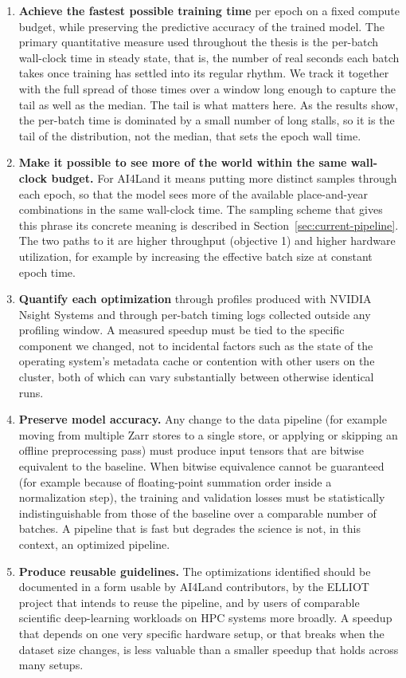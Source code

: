 \documentclass[12pt,a4paper]{article}
\begin{document}
\begin{enumerate}
  \item \textbf{Achieve the fastest possible training time} per epoch on a fixed compute
    budget, while preserving the predictive accuracy of the trained model. The primary
    quantitative measure used throughout the thesis is the per-batch wall-clock time in
    steady state, that is, the number of real seconds each batch takes once training has
    settled into its regular rhythm. We track it together with the full spread of those
    times over a window long enough to capture the tail as well as the median. The tail is what matters here. As the results
    show, the per-batch time is dominated by a small number of long stalls, so it is the tail
    of the distribution, not the median, that sets the epoch wall time.
  \item \textbf{Make it possible to see more of the world within the same wall-clock budget.}
    For AI4Land it means putting more distinct samples through each epoch, so that the model sees
    more of the available place-and-year combinations in the same wall-clock time. The sampling
    scheme that gives this phrase its concrete meaning is described in
    Section~\ref{sec:current-pipeline}. The two paths to it are higher throughput (objective 1) and
    higher hardware utilization, for example by increasing the effective batch size at constant
    epoch time.
  \item \textbf{Quantify each optimization} through profiles produced with NVIDIA Nsight
    Systems and through per-batch timing logs collected outside any profiling window. A
    measured speedup must be tied to the specific component we changed, not to incidental
    factors such as the state of the operating system's metadata cache or contention with
    other users on the cluster, both of which can vary substantially between otherwise
    identical runs.
  \item \textbf{Preserve model accuracy.} Any change to the data pipeline (for example moving
    from multiple Zarr stores to a single store, or applying or skipping an offline
    preprocessing pass) must produce input tensors that are bitwise equivalent to the
    baseline. When bitwise equivalence cannot be guaranteed (for example because of
    floating-point summation order inside a normalization step), the training and validation
    losses must be statistically indistinguishable from those of the baseline over a
    comparable number of batches. A pipeline that is fast but degrades the science is not, in
    this context, an optimized pipeline.
  \item \textbf{Produce reusable guidelines.} The optimizations identified should be
    documented in a form usable by AI4Land contributors, by the ELLIOT project that intends
    to reuse the pipeline, and by users of comparable scientific deep-learning workloads on
    HPC systems more broadly. A speedup that depends on one very specific hardware setup, or
    that breaks when the dataset size changes, is less valuable than a smaller speedup that
    holds across many setups.
\end{enumerate}
\end{document}
